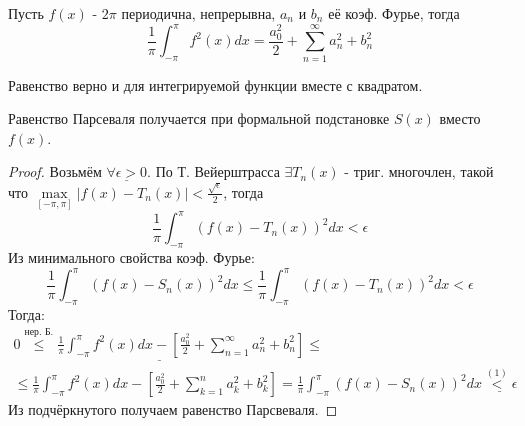 \documentclass{article}
\begin{document}
\begin{theorem} 
  Пусть $f(x)$ - $2\pi$ периодична, непрерывна,
  $a_n$ и $b_n$ её коэф. Фурье, тогда
  \[
    \frac{1}{\pi}\int_{-\pi}^{\pi}f^{2}(x)dx=\frac{a_0^{2}}{2}+\sum_{n=1}^{\infty}a_n^{2}+b_n^{2}
  \]
\end{theorem}
\begin{remark}
  Равенство верно и для интегрируемой функции вместе с квадратом.
\end{remark}
\begin{remark}
  Равенство Парсеваля получается при формальной подстановке $S(x)$ вместо $f(x)$.
\end{remark}
\begin{proof}
  Возьмём $\underline{\forall \epsilon > 0}$. По Т. Вейерштрасса
  $\exists T_n(x)$ - триг. многочлен, такой что
  $\max \limits_{[-\pi,\pi]}|f(x)-T_n(x)|<\frac{\sqrt{\epsilon}}{2}$, тогда
  \[
    \frac{1}{\pi}\int_{-\pi}^{\pi}(f(x)-T_n(x))^{2}dx<\epsilon
  \]
  Из минимального свойства коэф. Фурье:
  \[
    \frac{1}{\pi}\int_{-\pi}^{\pi}(f(x)-S_n(x))^{2}dx
    \le \frac{1}{\pi}\int_{-\pi}^{\pi}(f(x)-T_n(x))^{2}dx < \epsilon \tag{$1$}
  \]
  Тогда:
  \begin{gather*}
    \underline{0\overset{\text{нер. Б.}}{\le }\frac{1}{\pi}\int_{-\pi}^{\pi}f^{2}(x)dx-\left[\frac{a_0^{2}}{2}+\sum_{n=1}^{\infty}a_n^{2}+b_n^{2}\right]} \le \\
    \le \frac{1}{\pi}\int_{-\pi}^{\pi}f^{2}(x)dx- \left[\frac{a_0^{2}}{2}+\sum_{k=1}^{n}a_k^{2}+b_k^{2}\right]
    = \frac{1}{\pi}\int_{-\pi}^{\pi}(f(x)-S_n(x))^{2}dx \underline{\overset{(1)}{<} \epsilon}
  \end{gather*}
  Из подчёркнутого получаем равенство Парсвеваля.
\end{proof}
\end{document}
